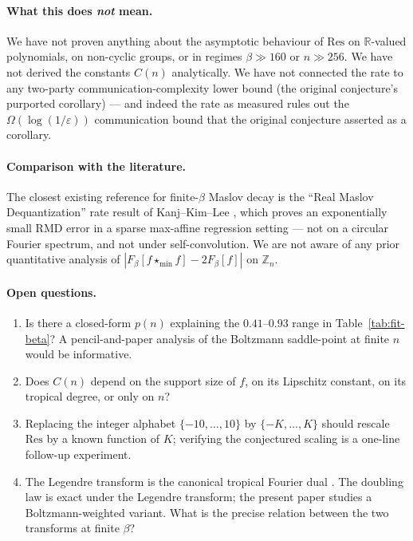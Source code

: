 \documentclass[11pt,a4paper]{article}
\begin{document}
\paragraph{What this does \emph{not} mean.}
We have not proven anything about the asymptotic behaviour of $\mathrm{Res}$
on $\mathbb{R}$-valued polynomials, on non-cyclic groups, or in regimes
$\beta \gg 160$ or $n \gg 256$. We have not derived the constants $C(n)$
analytically. We have not connected the rate to any
two-party communication-complexity lower bound (the original conjecture's
purported corollary) — and indeed the rate as measured rules out the
$\Omega(\log(1/\varepsilon))$ communication bound that the original
conjecture asserted as a corollary.

\paragraph{Comparison with the literature.}
The closest existing reference for finite-$\beta$ Maslov decay is the
``Real Maslov Dequantization'' rate result of Kanj--Kim--Lee
\cite{KanjKimLee2024}, which proves an exponentially small RMD error
in a sparse max-affine regression setting --- not on a circular Fourier
spectrum, and not under self-convolution. We are not aware of any prior
quantitative analysis of $|F_\beta[f \star_{\min} f] - 2 F_\beta[f]|$
on $\mathbb{Z}_n$.

\paragraph{Open questions.}
\begin{enumerate}
\item Is there a closed-form $p(n)$ explaining the $0.41$--$0.93$ range
in Table~\ref{tab:fit-beta}? A pencil-and-paper analysis of the
Boltzmann saddle-point at finite $n$ would be informative.
\item Does $C(n)$ depend on the support size of $f$, on its Lipschitz
constant, on its tropical degree, or only on $n$?
\item Replacing the integer alphabet $\{-10,\dots,10\}$ by
$\{-K,\dots,K\}$ should rescale $\mathrm{Res}$ by a known function of $K$;
verifying the conjectured scaling is a one-line follow-up experiment.
\item The Legendre transform is the canonical tropical Fourier dual
\cite{CohenGaubertQuadratSinger2004}. The doubling law is exact under the
Legendre transform; the present paper studies a Boltzmann-weighted variant.
What is the precise relation between the two transforms at finite $\beta$?
\end{enumerate}
\end{document}

